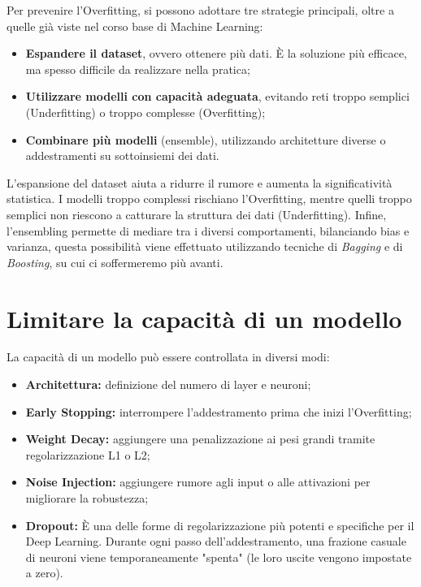 Per prevenire l’Overfitting, si possono adottare tre strategie principali, oltre a quelle già viste nel corso base di Machine Learning:

\begin{itemize}
    \item \textbf{Espandere il dataset}, ovvero ottenere più dati. È la soluzione più efficace, ma spesso difficile da realizzare nella pratica;
    \item \textbf{Utilizzare modelli con capacità adeguata}, evitando reti troppo semplici (Underfitting) o troppo complesse (Overfitting);
    \item \textbf{Combinare più modelli} (ensemble), utilizzando architetture diverse o addestramenti su sottoinsiemi dei dati.
\end{itemize}

L’espansione del dataset aiuta a ridurre il rumore e aumenta la significatività statistica. I modelli troppo complessi rischiano l’Overfitting, mentre quelli troppo semplici non riescono a catturare la struttura dei dati (Underfitting). Infine, l’ensembling permette di mediare tra i diversi comportamenti, bilanciando bias e varianza, questa possibilità viene effettuato utilizzando tecniche di \textit{Bagging} e di \textit{Boosting}, su cui ci soffermeremo più avanti.

\section{Limitare la capacità di un modello}

La capacità di un modello può essere controllata in diversi modi:

\begin{itemize}
    \item \textbf{Architettura:} definizione del numero di layer e neuroni;
    \item \textbf{Early Stopping:} interrompere l’addestramento prima che inizi l’Overfitting;
    \item \textbf{Weight Decay:} aggiungere una penalizzazione ai pesi grandi tramite regolarizzazione L1 o L2;
    \item \textbf{Noise Injection:} aggiungere rumore agli input o alle attivazioni per migliorare la robustezza;
    \item \textbf{Dropout:} È una delle forme di regolarizzazione più potenti e specifiche per il Deep Learning. Durante ogni passo dell'addestramento, una frazione casuale di neuroni viene temporaneamente "spenta" (le loro uscite vengono impostate a zero).
\end{itemize}

